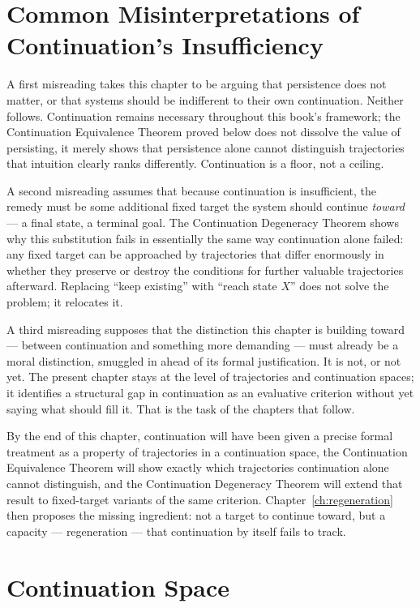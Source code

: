 \documentclass[12pt,twoside,openright]{book}
\begin{document}
\section{Common Misinterpretations of Continuation's
  Insufficiency}
\label{sec:ch10-misinterpretations}

A first misreading takes this chapter to be arguing that
persistence does not matter, or that systems should be
indifferent to their own continuation. Neither follows.
Continuation remains necessary throughout this book's
framework; the Continuation Equivalence Theorem proved below
does not dissolve the value of persisting, it merely shows
that persistence alone cannot distinguish trajectories that
intuition clearly ranks differently. Continuation is a floor,
not a ceiling.

A second misreading assumes that because continuation is
insufficient, the remedy must be some additional fixed
target the system should continue \emph{toward} --- a final
state, a terminal goal. The Continuation Degeneracy Theorem
shows why this substitution fails in essentially the same way
continuation alone failed: any fixed target can be approached
by trajectories that differ enormously in whether they
preserve or destroy the conditions for further valuable
trajectories afterward. Replacing ``keep existing'' with
``reach state $X$'' does not solve the problem; it relocates
it.

A third misreading supposes that the distinction this chapter
is building toward --- between continuation and something
more demanding --- must already be a moral distinction,
smuggled in ahead of its formal justification. It is not, or
not yet. The present chapter stays at the level of
trajectories and continuation spaces; it identifies a
structural gap in continuation as an evaluative criterion
without yet saying what should fill it. That is the task of
the chapters that follow.

By the end of this chapter, continuation will have been given
a precise formal treatment as a property of trajectories in a
continuation space, the Continuation Equivalence Theorem will
show exactly which trajectories continuation alone cannot
distinguish, and the Continuation Degeneracy Theorem will
extend that result to fixed-target variants of the same
criterion. Chapter~\ref{ch:regeneration} then proposes the
missing ingredient: not a target to continue toward, but a
capacity --- regeneration --- that continuation by itself
fails to track.

\section{Continuation Space}
\label{sec:ch10-space}
\end{document}
